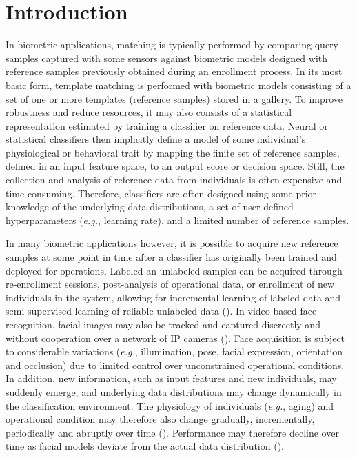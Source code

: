 \section{Introduction}

In biometric applications, matching is typically performed by comparing query samples captured with some sensors against biometric models designed with reference samples previously obtained during an enrollment process.
In its most basic form, template matching is performed with biometric models consisting of a set of one or more templates (reference samples) stored in a gallery.
To improve robustness and reduce resources, it may also consists of a statistical representation estimated by training a classifier on reference data.
Neural or statistical classifiers then implicitly define a model of some individual's physiological or behavioral trait by mapping the finite set of reference samples, defined in an input feature space, to an output score or decision space.
Still, the collection and analysis of reference data from individuals is often expensive and time consuming.
Therefore, classifiers are often designed using some prior knowledge of the underlying data distributions, a set of user-defined hyperparameters (\emph{e.g.}, learning rate), and a limited number of reference samples.

In many biometric applications however, it is possible to acquire new reference samples at some point in time after a classifier has originally been trained and deployed for operations.
Labeled an unlabeled samples can be acquired through re-enrollment sessions, post-analysis of operational data, or enrollment of new individuals in the system, allowing for incremental learning of labeled data and semi-supervised learning of reliable unlabeled data (\cite{jain06, roli08}).
In video-based face recognition, facial images may also be tracked and captured discreetly and without cooperation over a network of IP cameras (\cite{jain06}).
Face acquisition is subject to considerable variations (\emph{e.g.}, illumination, pose, facial expression, orientation and occlusion) due to limited control over unconstrained operational conditions.
In addition, new information, such as input features and new individuals, may suddenly emerge, and underlying data distributions may change dynamically in the classification environment.
The physiology of individuals  (\emph{e.g.}, aging) and operational condition may therefore also change gradually, incrementally, periodically and abruptly over time (\cite{zliobaite10}).
Performance may therefore decline over time as facial models deviate from the actual data distribution (\cite{granger01, poh09, tsymbal08}).

